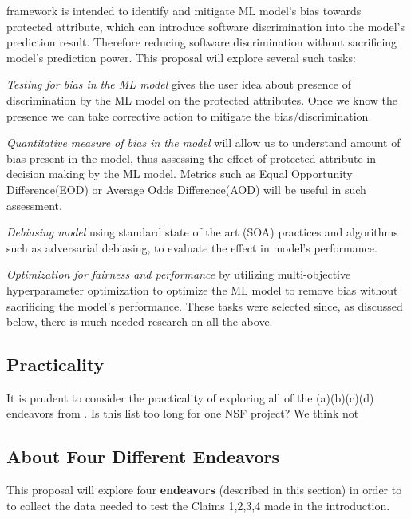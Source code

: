 {\IT} framework is intended to identify and mitigate ML model's bias towards protected attribute, which can introduce software discrimination into the model's prediction result. Therefore reducing software discrimination without sacrificing model's prediction power. This proposal will explore
several  such tasks:


\bi
\item[(a)] {\em Testing for bias in the ML model}
gives the user idea about presence of discrimination by the ML model on the protected attributes. Once we know the presence we can take corrective action to mitigate the bias/discrimination.
\item[(b)]  {\em Quantitative measure of bias in the model } will allow us to understand amount of bias present in the model, thus assessing the effect of protected attribute in decision making by the ML model. Metrics such as Equal   Opportunity   Difference(EOD) or Average Odds Difference(AOD) will be useful in such assessment.
\item [(c)] {\em Debiasing model }
using standard state of the art (SOA) practices and algorithms such as adversarial debiasing, to evaluate the effect in model's performance.
\item[(d)] {\em Optimization for fairness and performance} by utilizing multi-objective hyperparameter optimization to optimize the ML model to remove bias without sacrificing the model's performance. 
\ei
These tasks were selected since, as discussed below, there is much needed research on all the above.
 
 \subsection{Practicality}\label{tion:practical}

It is prudent to consider the practicality of exploring
all of the (a)(b)(c)(d) endeavors from . Is this list too long for
one NSF project? We think not 



\subsection{About Four Different Endeavors}\label{tion:four}
This proposal will explore  four
{\bf endeavors} (described in this section)
in order to 
to collect the data needed to test the  Claims 1,2,3,4 made in the introduction. 


